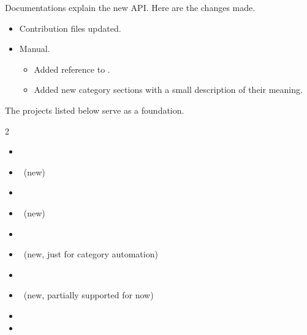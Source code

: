 \documentclass{tutodoc}
\begin{document}
\begin{tdocupdate}
    \item Documentations explain the new API. Here are the changes made.
    \begin{itemize}
        \item Contribution  files updated.


        \item Manual.
        \begin{itemize}
            \item Added reference to \carbonplan.

            \item Added new category sections with a small description of their meaning.
        \end{itemize}
    \end{itemize}


    \item The projects listed below serve as a foundation.

    \bgroup
    \setlength{\multicolsep}{3pt}
    \begin{multicols}{2}
    \begin{itemize}
        \item \asymptote
        \item \carbonplan\      (new)
        \item \cartocolors
        \item \cmasher\         (new)
        \item {}
        \item {}\       (new, just for category automation)
        \item \matplotlib
        \item \nclcolortables\  (new, partially supported for now)
        \item \palettable
        \item \scicolmaps
    \end{itemize}
    \end{multicols}
    \egroup
\end{tdocupdate}
\end{document}
